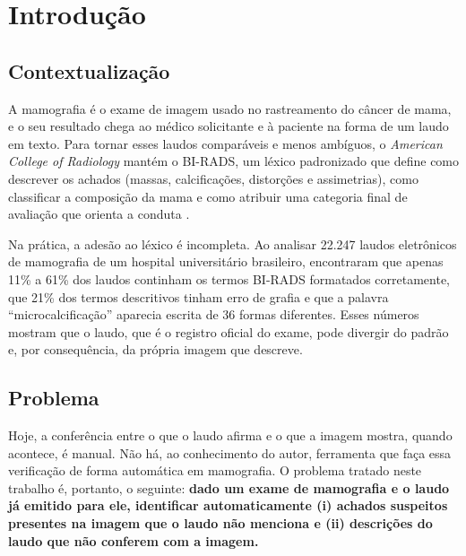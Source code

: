 \chapter{Introdução}\label{cap:introducao}

\section{Contextualização}

A mamografia é o exame de imagem usado no rastreamento do câncer de mama, e o seu resultado chega ao médico solicitante e à paciente na forma de um laudo em texto. Para tornar esses laudos comparáveis e menos ambíguos, o \textit{American College of Radiology} mantém o BI-RADS, um léxico padronizado que define como descrever os achados (massas, calcificações, distorções e assimetrias), como classificar a composição da mama e como atribuir uma categoria final de avaliação que orienta a conduta \cite{dorsi2013birads}. 

Na prática, a adesão ao léxico é incompleta. Ao analisar 22.247 laudos eletrônicos de mamografia de um hospital universitário brasileiro,  encontraram que apenas 11\% a 61\% dos laudos continham os termos BI-RADS formatados corretamente, que 21\% dos termos descritivos tinham erro de grafia e que a palavra ``microcalcificação'' aparecia escrita de 36 formas diferentes. Esses números mostram que o laudo, que é o registro oficial do exame, pode divergir do padrão e, por consequência, da própria imagem que descreve.

\section{Problema}

Hoje, a conferência entre o que o laudo afirma e o que a imagem mostra, quando acontece, é manual. Não há, ao conhecimento do autor, ferramenta que faça essa verificação de forma automática em mamografia. O problema tratado neste trabalho é, portanto, o seguinte: \textbf{dado um exame de mamografia e o laudo já emitido para ele, identificar automaticamente (i) achados suspeitos presentes na imagem que o laudo não menciona e (ii) descrições do laudo que não conferem com a imagem.}

